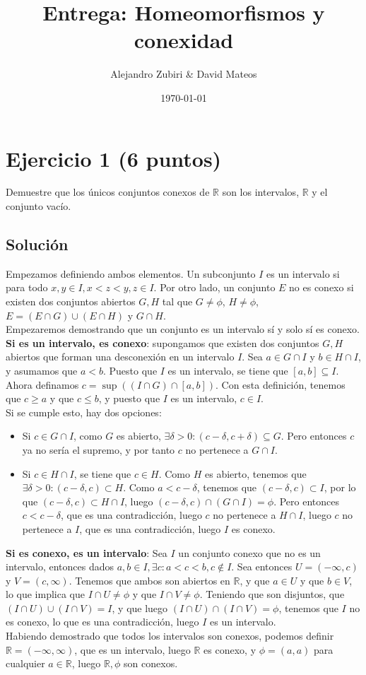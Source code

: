 \documentclass{amsbook}
\author{Alejandro Zubiri \& David Mateos}
\date{\today}
\title{Entrega: Homeomorfismos y conexidad}
\begin{document}
\maketitle
\section{Ejercicio 1 (6 puntos)}
Demuestre que los únicos conjuntos conexos de \(\mathbb{R}\) son los intervalos, \(\mathbb{R}\) y el
conjunto vacío.\\
\subsection{Solución}
Empezamos definiendo ambos elementos. Un subconjunto $I$ es un intervalo
si para todo $x,y\in I, x < z < y, z \in I$. Por otro lado, un conjunto $E$
no es conexo si existen dos conjuntos abiertos $G,H$ tal que $G \neq \phi$,
$H \neq \phi$, $E = (E \cap G) \cup (E \cap H)$ y $G \cap H $.\\
Empezaremos demostrando que un conjunto es un intervalo sí y solo sí 
es conexo.\\
\textbf{Si es un intervalo, es conexo}: supongamos que existen dos conjuntos
$G,H$ abiertos que forman una desconexión en un intervalo $I$. Sea $a \in G \cap I$ y $b \in H \cap I$,
y asumamos que $a < b$. Puesto que $I$ es un intervalo, se tiene que $[a,b] \subseteq I$.
Ahora definamos $c= \sup((I \cap G)\cap [a,b])$. Con esta definición, tenemos 
que $c \geq a$ y que $c \leq b$, y puesto que $I$ es un intervalo, $c \in I$.\\
Si se cumple esto, hay dos opciones:
\begin{itemize}
  \item Si $c \in G \cap I$, como $G$ es abierto, $\exists \delta > 0 : (c-\delta, c + \delta) \subseteq G$.
    Pero entonces $c$ ya no sería el supremo, y por tanto $c$ no pertenece a $G \cap I$.
  \item Si $c \in H \cap I$, se tiene que $c \in H$. Como $H$ es abierto, tenemos que
    $\exists \delta > 0: (c -\delta, c) \subset H$. Como $a < c-\delta$, tenemos que 
    $(c-\delta, c) \subset I$, por lo que $(c-\delta, c)\subset H \cap I$, luego 
    $(c-\delta, c) \cap (G \cap I) = \phi$. Pero entonces $c < c-\delta$, que es una contradicción,
    luego $c$ no pertenece a $H \cap I$, luego $c$ no pertenece a $I$, que es una 
    contradicción, luego $I$ es conexo.
\end{itemize}
\textbf{Si es conexo, es un intervalo}: Sea $I$ un conjunto conexo que no es un intervalo,
entonces dados $a,b \in I, \exists c: a < c < b, c \notin I$. Sea entonces $U= (-\infty, c)$
y $V = (c, \infty)$. Tenemos que ambos son abiertos en $\mathbb{R}$, y que 
$a \in U$ y que $b \in V$, lo que implica que $I \cap U \neq \phi$ y que $I \cap V \neq \phi$.
Teniendo que son disjuntos, que $(I\cap U)\cup(I\cap V) = I$, y que luego
$(I\cap U)\cap (I \cap V) = \phi$, tenemos que $I$ no es conexo, lo que es una contradicción,
luego $I$ es un intervalo.\\
Habiendo demostrado que todos los intervalos son conexos, podemos definir $\mathbb{R} = (-\infty, \infty)$,
que es un intervalo, luego $\mathbb{R}$ es conexo, y $\phi = (a,a)$ para cualquier $a \in \mathbb{R}$,
luego $\mathbb{R}, \phi$ son conexos.
\end{document}

